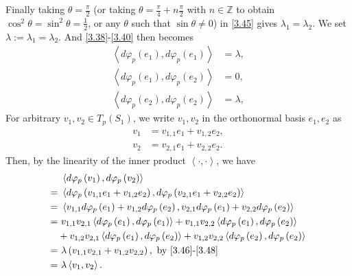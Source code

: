 \documentclass[a4paper]{article}
\numberwithin{equation}{section}
\begin{document}
Finally taking $\theta =\frac{\pi}{2}$ (or taking $\theta  = \frac{\pi }{4} + n\frac{\pi }{2}$ with $n\in \mathbb{Z}$ to obtain ${\cos ^2}\theta  = {\sin ^2}\theta  = \frac{1}{2}$, or any $\theta$ such that $\sin \theta \ne 0$) in \eqref{3.45} gives $\lambda _1=\lambda _2$. We set $\lambda :=\lambda _1=\lambda_2$. And \eqref{3.38}-\eqref{3.40} then becomes
\begin{align}
\label{3.46}
\left\langle {d{\varphi _p}\left( {{e_1}} \right),d{\varphi _p}\left( {{e_1}} \right)} \right\rangle  &= \lambda ,\\
\left\langle {d{\varphi _p}\left( {{e_1}} \right),d{\varphi _p}\left( {{e_2}} \right)} \right\rangle  &= 0,\\
\left\langle {d{\varphi _p}\left( {{e_2}} \right),d{\varphi _p}\left( {{e_2}} \right)} \right\rangle  &= \lambda , \label{3.48}
\end{align}
For arbitrary $v_1,v_2\in T_p\left(S_1\right)$, we write $v_1,v_2$ in the orthonormal basis $e_1,e_2$ as
\begin{align}
{v_1} &= {v_{1,1}}{e_1} + {v_{1,2}}{e_2},\\
{v_2} &= {v_{2,1}}{e_1} + {v_{2,2}}{e_2}.
\end{align}
Then, by the linearity of the inner product $\left\langle { \cdot , \cdot } \right\rangle $, we have
\begin{align}
&\ \left\langle {d{\varphi _p}\left( {{v_1}} \right),d{\varphi _p}\left( {{v_2}} \right)} \right\rangle  \\
=&\ \left\langle {d{\varphi _p}\left( {{v_{1,1}}{e_1} + {v_{1,2}}{e_2}} \right),d{\varphi _p}\left( {{v_{2,1}}{e_1} + {v_{2,2}}{e_2}} \right)} \right\rangle \\
 =&\ \left\langle {{v_{1,1}}d{\varphi _p}\left( {{e_1}} \right) + {v_{1,2}}d{\varphi _p}\left( {{e_2}} \right),{v_{2,1}}d{\varphi _p}\left( {{e_1}} \right) + {v_{2,2}}d{\varphi _p}\left( {{e_2}} \right)} \right\rangle \\
 =&\ {v_{1,1}}{v_{2,1}}\left\langle {d{\varphi _p}\left( {{e_1}} \right),d{\varphi _p}\left( {{e_1}} \right)} \right\rangle  + {v_{1,1}}{v_{2,2}}\left\langle {d{\varphi _p}\left( {{e_1}} \right),d{\varphi _p}\left( {{e_2}} \right)} \right\rangle \\
 &+ {v_{1,2}}{v_{2,1}}\left\langle {d{\varphi _p}\left( {{e_1}} \right),d{\varphi _p}\left( {{e_2}} \right)} \right\rangle  + {v_{1,2}}{v_{2,2}}\left\langle {d{\varphi _p}\left( {{e_2}} \right),d{\varphi _p}\left( {{e_2}} \right)} \right\rangle \\
 =&\ \lambda \left( {{v_{1,1}}{v_{2,1}} + {v_{1,2}}{v_{2,2}}} \right),  \mbox{ by \eqref{3.46}-\eqref{3.48}}\\
 =&\ \lambda \left\langle {{v_1},{v_2}} \right\rangle .
\end{align}
\end{document}
